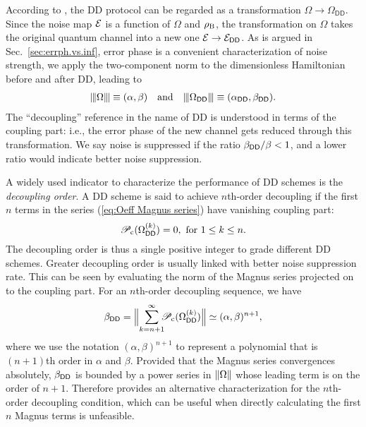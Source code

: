 \documentclass[aps,pra,reprint,superscriptaddress]{revtex4-2}
\newcommand{\Odd}{\Omega_{\mathsf{DD}}}
\newcommand{\Pcp}{\mathscr{P}_{\mathrm{c}}}
\begin{document}
According to , the DD protocol can be regarded as a transformation $\Omega \to \Odd$. Since the noise map $\mathcal{E}$ is a function of $\Omega$ and $\rho_\mathrm{B}$, the transformation on $\Omega$ takes the original quantum channel into a new 
one  $\mathcal{E}\to\mathcal{E}_{\mathsf{DD}}$. 
As is argued in Sec.~\!\ref{sec:errph.vs.inf}, error phase is a convenient characterization of noise strength, we apply the two-component norm to the dimensionless Hamiltonian before and after DD, leading to 
\begin{align}
    \opnorm{\Omega} \equiv (\alpha,\beta) \quad \mathrm{and}\quad  \opnorm{\Odd} \equiv (\alpha_\sDD,\beta_\sDD).
\end{align}
The ``decoupling'' reference in the name of DD is understood in terms of the coupling part: i.e., the error phase of the new channel gets reduced through this transformation.
We say noise is suppressed if the ratio $\beta_{\mathsf{DD}}/\beta<1$, and a lower ratio would indicate better noise suppression.


A widely used indicator to characterize the performance of DD schemes is the \emph{decoupling order}. A DD scheme is said to achieve $n$th-order decoupling  if the first $n$ terms in the series (\ref{eq:Oeff Magnus series}) have vanishing coupling part:
\begin{equation}\label{dd:nth-order-condition}
\Pcp(\Omega_{\sDD}\up{k}) =0,\ \text{for } 1\le k \le n.  
\end{equation}
The decoupling order is thus a single positive integer to grade different DD schemes. Greater decoupling order is usually linked with better noise suppression rate. 
This can be seen by evaluating the norm of the Magnus series projected on to the coupling part. For an $n$th-order decoupling sequence, we have
\begin{equation}\label{eq:nth-order-alternative}
\beta_\sDD 
=\norm[\Big]{\sum_{ k=n+1}^\infty \!\!\! \Pcp(\Omega_{\sDD}\up{k}) }
\simeq (\alpha,\beta)^{n+1},
\end{equation}
where we use the notation $(\alpha,\beta)^{n+1}$ to represent a polynomial that is $(n+1)$th order in $\alpha$ and $\beta$.
Provided that the Magnus series convergences absolutely, $\beta_{\mathsf{DD}}$ is bounded by a power series in $\Vert {\Omega} \Vert$ whose leading term is on the order of $n+1$.
Therefore  provides an alternative characterization for the $n$th-order decoupling condition, which can be useful when directly calculating the first $n$ Magnus terms is unfeasible.
\end{document}
